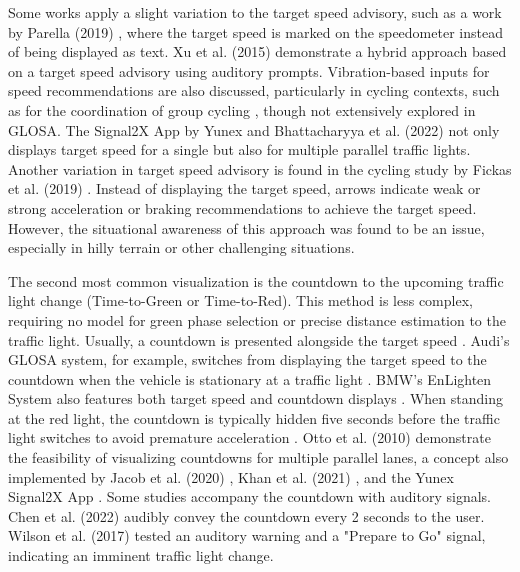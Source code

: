 Some works apply a slight variation to the target speed advisory, such as a work by Parella (2019) \cite{marias_parella_design_2019}, where the target speed is marked on the speedometer instead of being displayed as text. Xu et al. (2015) \cite{xu_bb_2015} demonstrate a hybrid approach based on a target speed advisory using auditory prompts. Vibration-based inputs for speed recommendations are also discussed, particularly in cycling contexts, such as for the coordination of group cycling \cite{cespedes_group_2019}, though not extensively explored in GLOSA. The Signal2X App by Yunex \cite{yunex_traffic_v2x-kommunikation_2023} and Bhattacharyya et al. (2022) \cite{bhattacharyya_assessing_2022} not only displays target speed for a single but also for multiple parallel traffic lights. Another variation in target speed advisory is found in the cycling study by Fickas et al. (2019) \cite{fickas_fast_2019}. Instead of displaying the target speed, arrows indicate weak or strong acceleration or braking recommendations to achieve the target speed. However, the situational awareness of this approach was found to be an issue, especially in hilly terrain or other challenging situations.

The second most common visualization is the countdown to the upcoming traffic light change (Time-to-Green or Time-to-Red). This method is less complex, requiring no model for green phase selection or precise distance estimation to the traffic light. Usually, a countdown is presented alongside the target speed \cite{koukoumidis_signalguru_2011, koukoumidis_leveraging_2012}. Audi's GLOSA system, for example, switches from displaying the target speed to the countdown when the vehicle is stationary at a traffic light \cite{zweck_traffic_2013}. BMW's EnLighten System also features both target speed and countdown displays \cite{sokolov_effects_2018}. When standing at the red light, the countdown is typically hidden five seconds before the traffic light switches to avoid premature acceleration \cite{stahlmann_exploring_2018, sokolov_effects_2018}. Otto et al. (2010) \cite{otto_operating_2010} demonstrate the feasibility of visualizing countdowns for multiple parallel lanes, a concept also implemented by Jacob et al. (2020) \cite{jacob_ivs-kom_2020}, Khan et al. (2021) \cite{khan_eco-drive_2021}, and the Yunex Signal2X App \cite{yunex_traffic_v2x-kommunikation_2023}. Some studies accompany the countdown with auditory signals. Chen et al. (2022) \cite{chen_developing_2022} audibly convey the countdown every 2 seconds to the user. Wilson et al. (2017) \cite{wilson_driver_2017} tested an auditory warning and a "Prepare to Go" signal, indicating an imminent traffic light change.

